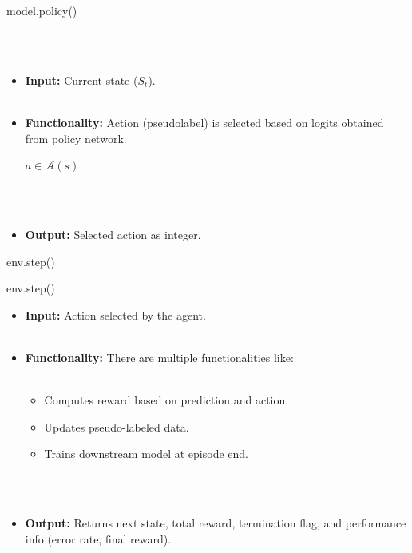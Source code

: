 \documentclass{beamer}
\begin{document}
\begin{frame}{model.policy()}
  
   \\~\\
  \begin{itemize}
    \item \textbf{Input:} Current state ($S_{t}$).\\~\\
    \item \textbf{Functionality:} Action (pseudolabel) is selected based on logits obtained from policy network. 
    \begin{center}
      $a \in \mathcal{A}(s)$
    \end{center} \\~\\
      \begin{itemize}
      \end{itemize}
    \item \textbf{Output:} Selected action as integer.
  \end{itemize}
\end{frame}

\begin{frame}{env.step()}
  
\end{frame}

\begin{frame}[fragile]{env.step()}
  \begin{itemize}
    \item \textbf{Input:} Action selected by the agent.  \\~\\
    \item \textbf{Functionality:} There are multiple functionalities like: \\~\\
      \begin{itemize}
        \item Computes reward based on prediction and action.
        \item Updates pseudo-labeled data.
        \item Trains downstream model at episode end.
      \end{itemize} \\~\\
    \item \textbf{Output:} Returns next state, total reward, termination flag, and performance info (error rate, final reward).
  \end{itemize}
\end{frame}
\end{document}

